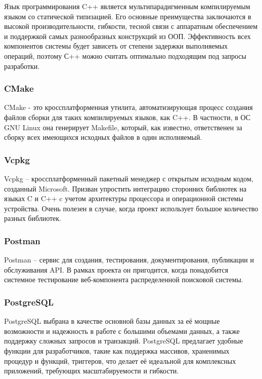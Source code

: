Язык программирования C++ является мультипарадигменным компилируемым языком со статической типизацией. Его основные преимущества заключаются в высокой производительности, гибкости, тесной связи с аппаратным обеспечением и поддержкой самых разнообразных конструкций из ООП. Эффективность всех компонентов системы будет зависеть от степени задержки выполняемых операций, поэтому С++ можно считать оптимально подходящим под запросы разработки.

\subsubsection{CMake}

CMake - это кроссплатформенная утилита, автоматизирующая процесс создания файлов сборки для таких компилируемых языков, как C++. В частности, в ОС GNU Linux она генерирует Makefile, который, как известно, ответственен за сборку всех имеющихся исходных файлов в один исполняемый. 

\subsubsection{Vcpkg}
Vcpkg -- кроссплатформенный пакетный менеджер с открытым исходным кодом, созданный Microsoft. Призван упростить интеграцию сторонних библиотек на языках C и C++ c учетом архитектуры процессора и операционной системы устройства. Очень полезен в случае, когда проект использует большое количество разных библиотек.

\subsubsection{Postman}
Postman -- сервис для создания, тестирования, документирования, публикации и обслуживания API. В рамках проекта он пригодится, когда понадобится системное тестирование веб-компонента распределенной поисковой системы.

\subsubsection{PostgreSQL}

PostgreSQL выбрана в качестве основной базы данных за её мощные возможности и надежность в работе с большими объемами данных, а также поддержку сложных запросов и транзакций. PostgreSQL предлагает удобные функции для разработчиков, такие как поддержка массивов, храненимых процедур и функций, триггеров, что делает её идеальной для комплексных приложений, требующих масштабируемости и гибкости.

